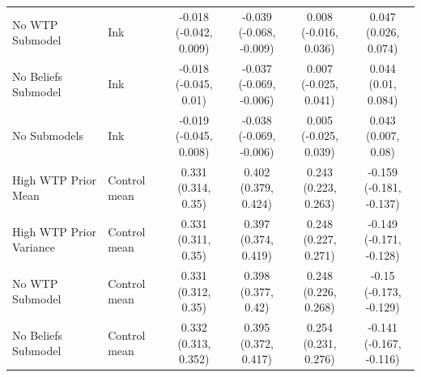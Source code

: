 \documentclass[
]{article}
\begin{document}
\begin{table}
{\begin{tabular}[t]{llcccc}
No WTP Submodel & Ink & \makecell[c]{-0.018\\(-0.042, 0.009)} & \makecell[c]{-0.039\\(-0.068, -0.009)} & \makecell[c]{0.008\\(-0.016, 0.036)} & \makecell[c]{0.047\\(0.026, 0.074)}\\
No Beliefs Submodel & Ink & \makecell[c]{-0.018\\(-0.045, 0.01)} & \makecell[c]{-0.037\\(-0.069, -0.006)} & \makecell[c]{0.007\\(-0.025, 0.041)} & \makecell[c]{0.044\\(0.01, 0.084)}\\
No Submodels & Ink & \makecell[c]{-0.019\\(-0.045, 0.008)} & \makecell[c]{-0.038\\(-0.069, -0.006)} & \makecell[c]{0.005\\(-0.025, 0.039)} & \makecell[c]{0.043\\(0.007, 0.08)}\\
\midrule
High WTP Prior Mean & Control mean & \makecell[c]{0.331\\(0.314, 0.35)} & \makecell[c]{0.402\\(0.379, 0.424)} & \makecell[c]{0.243\\(0.223, 0.263)} & \makecell[c]{-0.159\\(-0.181, -0.137)}\\
High WTP Prior Variance & Control mean & \makecell[c]{0.331\\(0.311, 0.35)} & \makecell[c]{0.397\\(0.374, 0.419)} & \makecell[c]{0.248\\(0.227, 0.271)} & \makecell[c]{-0.149\\(-0.171, -0.128)}\\
No WTP Submodel & Control mean & \makecell[c]{0.331\\(0.312, 0.35)} & \makecell[c]{0.398\\(0.377, 0.42)} & \makecell[c]{0.248\\(0.226, 0.268)} & \makecell[c]{-0.15\\(-0.173, -0.129)}\\
No Beliefs Submodel & Control mean & \makecell[c]{0.332\\(0.313, 0.352)} & \makecell[c]{0.395\\(0.372, 0.417)} & \makecell[c]{0.254\\(0.231, 0.276)} & \makecell[c]{-0.141\\(-0.167, -0.116)}\\

\end{tabular}}
\end{table}
\end{document}

